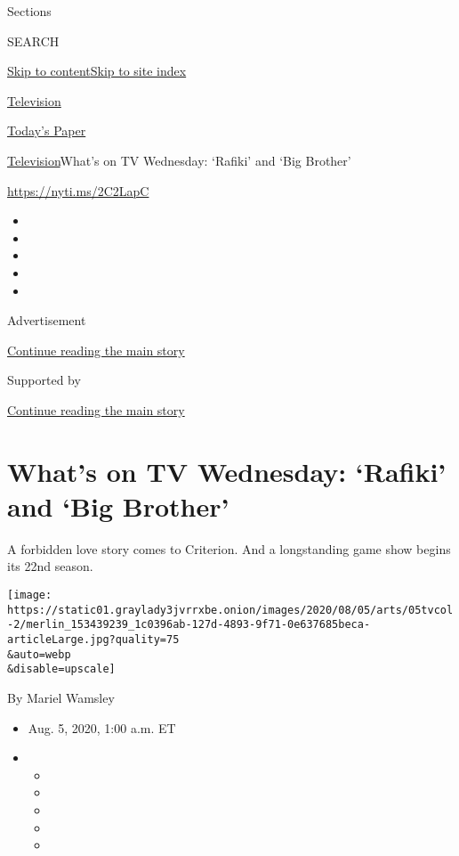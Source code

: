 Sections

SEARCH

\protect\hyperlink{site-content}{Skip to
content}\protect\hyperlink{site-index}{Skip to site index}

\href{https://www.nytimes3xbfgragh.onion/section/arts/television}{Television}

\href{https://myaccount.nytimes3xbfgragh.onion/auth/login?response_type=cookie\&client_id=vi}{}

\href{https://www.nytimes3xbfgragh.onion/section/todayspaper}{Today's
Paper}

\href{/section/arts/television}{Television}\textbar{}What's on TV
Wednesday: `Rafiki' and `Big Brother'

\url{https://nyti.ms/2C2LapC}

\begin{itemize}
\item
\item
\item
\item
\item
\end{itemize}

Advertisement

\protect\hyperlink{after-top}{Continue reading the main story}

Supported by

\protect\hyperlink{after-sponsor}{Continue reading the main story}

\hypertarget{whats-on-tv-wednesday-rafiki-and-big-brother}{%
\section{What's on TV Wednesday: `Rafiki' and `Big
Brother'}\label{whats-on-tv-wednesday-rafiki-and-big-brother}}

A forbidden love story comes to Criterion. And a longstanding game show
begins its 22nd season.

\texttt{[image: https://static01.graylady3jvrrxbe.onion/images/2020/08/05/arts/05tvcol-2/merlin\_153439239\_1c0396ab-127d-4893-9f71-0e637685beca-articleLarge.jpg?quality=75\\\&auto=webp\\\&disable=upscale]}

By Mariel Wamsley

\begin{itemize}
\item
  Aug. 5, 2020, 1:00 a.m. ET
\item
  \begin{itemize}
  \item
  \item
  \item
  \item
  \item
  \end{itemize}
\end{itemize}

